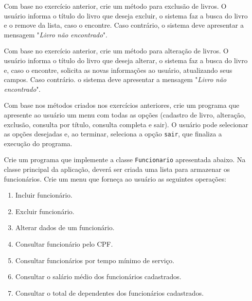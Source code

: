 \begin{exercise}[ExcluiLivro]
Com base no exercício anterior, crie um método para exclusão de livros. O usuário informa o título do livro que deseja excluir, o sistema faz a busca do livro e o remove da lista, caso o encontre. Caso contrário, o sistema deve apresentar a mensagem "\textit{Livro não encontrado}".
\end{exercise}	

\begin{exercise}[AlteraLivro]
Com base no exercício anterior, crie um método para alteração de livros. O usuário informa o título do livro que deseja alterar, o sistema faz a busca do livro e, caso o encontre, solicita as novas informações ao usuário, atualizando seus campos. Caso contrário. o sistema deve apresentar a mensagem "\textit{Livro não encontrado}".
\end{exercise}

\begin{exercise}[LivrosCompleto]
Com base nos métodos criados nos exercícios anteriores, crie um programa que apresente ao usuário um menu com todas as opções (cadastro de livro, alteração, exclusão, consulta por título, consulta completa e sair). O usuário pode selecionar as opções desejadas e, ao terminar, seleciona a opção \texttt{sair}, que finaliza a execução do programa.
\end{exercise}

\begin{exercise}[Funcionario]
Crie um programa que implemente a classe \texttt{Funcionario} apresentada abaixo. Na classe principal da aplicação, deverá ser criada uma lista para armazenar os funcionários. Crie um menu que forneça ao usuário as seguintes operações:

\begin{figure}[h]
	\centering
\end{figure}

\begin{enumerate}
	\item Incluir funcionário.
	\item Excluir funcionário.
	\item Alterar dados de um funcionário.
	\item Consultar funcionário pelo CPF.
	\item Consultar funcionários por tempo mínimo de serviço.
	\item Consultar o salário médio dos funcionários cadastrados.
	\item Consultar o total de dependentes dos funcionários cadastrados.
\end{enumerate}
\end{exercise}

